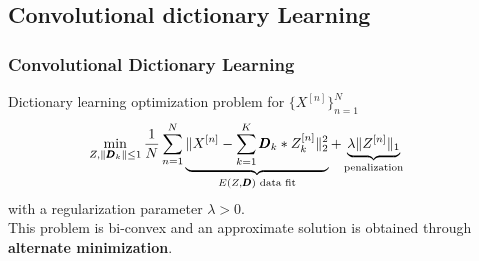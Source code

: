 \documentclass[main_dicodile]{subfiles}
\begin{document}
\subsection{Convolutional dictionary Learning}
\begin{frame}[t]
\frametitle{Convolutional Dictionary Learning}
Dictionary learning optimization problem for $\{X^{[n]}\}_{n=1}^N$ 
\[\hskip-2em\begin{split}
 \min_{Z, \|\pmb D_k\|\le 1}\frac{1}{N}\sum_{n=1}^N
			\underbrace{\| X^{[n]} - \sum_{k=1}^K\pmb D_k *  Z_k^{[n]}\|_2^2
						}_{E(Z, \pmb D) \text{ data fit}}
			+ \underbrace{\lambda\| Z^{[n]}\|_1
						}_{\text{penalization}}
\end{split}\]
with a regularization parameter $\lambda > 0$.\\[1.5em]
This problem is bi-convex and an approximate solution is obtained through \textbf{alternate minimization}. 
\end{frame}

\end{document}

